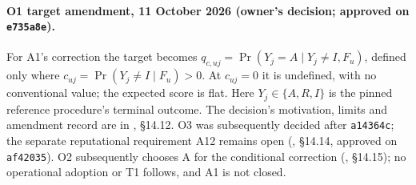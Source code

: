 \paragraph{O1 target amendment, 11 October 2026 (owner's decision; approved on \texttt{e735a8e}).}
For A1's correction the target becomes
$q_{c,uj}=\Pr(Y_j=A\mid Y_j\ne I,F_u)$, defined only where
$c_{uj}=\Pr(Y_j\ne I\mid F_u)>0$. At $c_{uj}=0$ it is undefined, with no conventional
value; the expected score is flat. Here $Y_j\in\{A,R,I\}$ is the pinned reference
procedure's terminal outcome. The decision's motivation, limits and amendment record are
in , \S14.12. O3 was subsequently decided after \texttt{a14364c}; the
separate reputational requirement A12 remains open (, \S14.14, approved on
\texttt{af42035}). O2 subsequently chooses A for the conditional correction
(, \S14.15); no operational adoption or T1 follows, and A1 is not closed.

